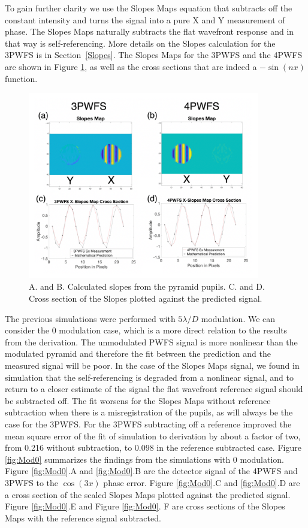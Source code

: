 To gain further clarity we use the Slopes Maps equation that subtracts off the constant intensity and turns the signal into a pure X and Y measurement of phase. The Slopes Maps naturally subtracts the flat wavefront response and in that way is self-referencing.  More details on the Slopes calculation  for the 3PWFS is in Section~\ref{Slopes}. The Slopes Maps for the 3PWFS and the 4PWFS are shown in Figure \ref{fig:SlopesMapDiagram}, as well as the cross sections that are indeed a $-\sin(nx)$ function. 

\begin{figure}
    \centering
    \includegraphics[width=0.9\textwidth]{Chapter Materials/Chapter Two Materials/SlopesandSlices.png}
    \caption{A. and B. Calculated slopes from the pyramid pupils. C. and D. Cross section of the Slopes plotted against the predicted signal. }
    \label{fig:SlopesMapDiagram}
\end{figure}

The previous simulations were performed with $5\lambda/D$ modulation. We can consider the 0 modulation case, which is a more direct relation to the results from the derivation. The unmodulated PWFS signal is more nonlinear than the modulated pyramid and therefore the fit between the prediction and the measured signal will be poor. In the case of the Slopes Maps signal, we found in simulation that the self-referencing is degraded from a nonlinear signal, and to return to a closer estimate of the signal the flat wavefront reference signal should be subtracted off. The fit worsens for the Slopes Maps without reference subtraction when there is a misregistration of the pupils, as will always be the case for the 3PWFS. For the 3PWFS subtracting off a reference improved the mean square error of the fit of simulation to derivation by about a factor of two, from 0.216 without subtraction, to 0.098 in the reference subtracted case. Figure \ref{fig:Mod0} summarizes the findings from the simulations with 0 modulation. Figure \ref{fig:Mod0}.A and \ref{fig:Mod0}.B are the detector signal of the 4PWFS and 3PWFS to the $\cos(3x)$ phase error. Figure \ref{fig:Mod0}.C and \ref{fig:Mod0}.D are a cross section of the scaled Slopes Maps plotted against the predicted signal. Figure \ref{fig:Mod0}.E and Figure \ref{fig:Mod0}. F are cross sections of the Slopes Maps with the reference signal subtracted.

